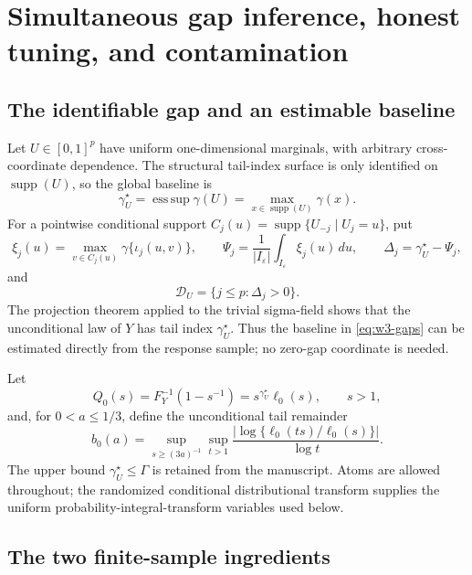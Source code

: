 \documentclass[11pt]{article}
\theoremstyle{remark}
\DeclareMathOperator*{\esssup}{ess\,sup}
\newcommand{\I}{I_\varepsilon}
\newcommand{\DU}{\mathcal D_U}
\begin{document}
\section{Simultaneous gap inference, honest tuning, and contamination}
\label{sec:wave3}

\subsection{The identifiable gap and an estimable baseline}

Let $U\in[0,1]^p$ have uniform one-dimensional marginals, with arbitrary
cross-coordinate dependence.  The structural tail-index surface is only
identified on $\operatorname{supp}(U)$, so the global baseline is
\begin{equation}
 \gamma_U^\star=\esssup\gamma(U)
 =\max_{x\in\operatorname{supp}(U)}\gamma(x).
 \label{eq:w3-gammastar}
\end{equation}
For a pointwise conditional support
$C_j(u)=\operatorname{supp}\{U_{-j}\mid U_j=u\}$, put
\begin{equation}
 \xi_j(u)=\max_{v\in C_j(u)}\gamma\{\iota_j(u,v)\},
 \qquad
 \Psi_j=\frac1{|\I|}\int_{\I}\xi_j(u)\,du,
 \qquad
 \Delta_j=\gamma_U^\star-\Psi_j,
 \label{eq:w3-gaps}
\end{equation}
and
\begin{equation}
 \DU=\{j\le p:\Delta_j>0\}.
 \label{eq:w3-DU}
\end{equation}
The projection theorem applied to the trivial sigma-field shows that the
unconditional law of $Y$ has tail index $\gamma_U^\star$.  Thus the baseline
in \eqref{eq:w3-gaps} can be estimated directly from the response sample; no
zero-gap coordinate is needed.

Let
\begin{equation}
 Q_0(s)=F_Y^{-1}(1-s^{-1})=s^{\gamma_U^\star}\ell_0(s),
 \qquad s>1,
 \label{eq:w3-global-quantile}
\end{equation}
and, for $0<a\le1/3$, define the unconditional tail remainder
\begin{equation}
 b_0(a)=\sup_{s\ge(3a)^{-1}}\sup_{t>1}
 \frac{|\log\{\ell_0(ts)/\ell_0(s)\}|}{\log t}.
 \label{eq:w3-b0}
\end{equation}
The upper bound $\gamma_U^\star\le\Gamma$ is retained from the manuscript.
Atoms are allowed throughout; the randomized conditional distributional
transform supplies the uniform probability-integral-transform variables used
below.

\subsection{The two finite-sample ingredients}
\end{document}
